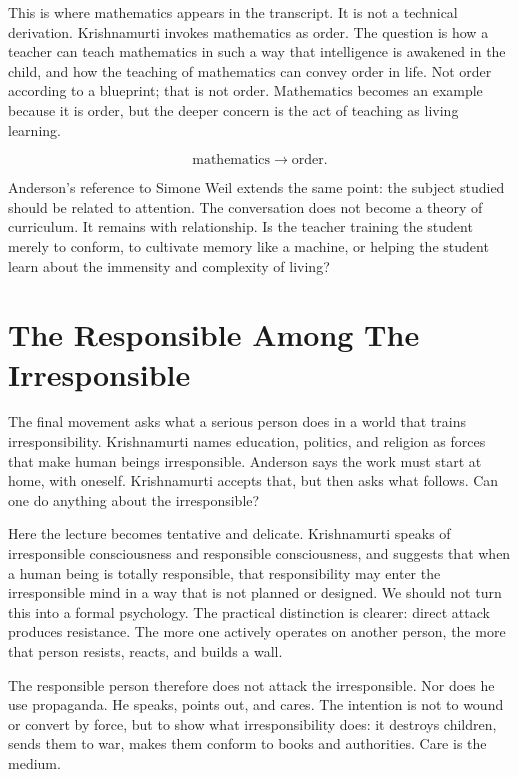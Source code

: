 This is where mathematics appears in the transcript. It is not a technical derivation. Krishnamurti invokes mathematics as order. The question is how a teacher can teach mathematics in such a way that intelligence is awakened in the child, and how the teaching of mathematics can convey order in life. Not order according to a blueprint; that is not order. Mathematics becomes an example because it is order, but the deeper concern is the act of teaching as living learning.

\begin{equation}
\text{mathematics}
\longrightarrow
\text{order}.
\end{equation}

Anderson's reference to Simone Weil extends the same point: the subject studied should be related to attention. The conversation does not become a theory of curriculum. It remains with relationship. Is the teacher training the student merely to conform, to cultivate memory like a machine, or helping the student learn about the immensity and complexity of living?

\section{The Responsible Among The Irresponsible}

The final movement asks what a serious person does in a world that trains irresponsibility. Krishnamurti names education, politics, and religion as forces that make human beings irresponsible. Anderson says the work must start at home, with oneself. Krishnamurti accepts that, but then asks what follows. Can one do anything about the irresponsible?

Here the lecture becomes tentative and delicate. Krishnamurti speaks of irresponsible consciousness and responsible consciousness, and suggests that when a human being is totally responsible, that responsibility may enter the irresponsible mind in a way that is not planned or designed. We should not turn this into a formal psychology. The practical distinction is clearer: direct attack produces resistance. The more one actively operates on another person, the more that person resists, reacts, and builds a wall.

The responsible person therefore does not attack the irresponsible. Nor does he use propaganda. He speaks, points out, and cares. The intention is not to wound or convert by force, but to show what irresponsibility does: it destroys children, sends them to war, makes them conform to books and authorities. Care is the medium.


